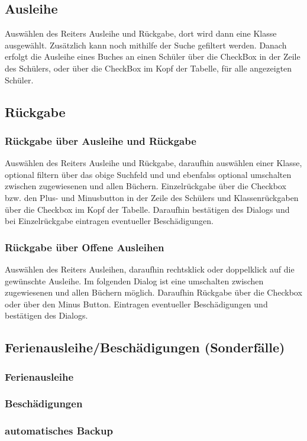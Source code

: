 \subsection{Ausleihe}
Auswählen des Reiters Ausleihe und Rückgabe, dort wird dann eine Klasse ausgewählt. Zusätzlich kann noch mithilfe der Suche  gefiltert werden. Danach erfolgt die Ausleihe eines Buches an einen Schüler über die CheckBox in der Zeile des Schülers, oder über die CheckBox im Kopf der Tabelle, für alle angezeigten Schüler.

\subsection{Rückgabe}
\subsubsection{Rückgabe über Ausleihe und Rückgabe}
Auswählen des Reiters Ausleihe und Rückgabe, daraufhin auswählen einer Klasse, optional filtern über das obige Suchfeld und und ebenfalss optional umschalten zwischen zugewiesenen und allen Büchern. Einzelrückgabe über die Checkbox bzw. den Plus- und Minusbutton in der Zeile des Schülers und Klassenrückgaben über die Checkbox im Kopf der Tabelle. Daraufhin bestätigen des Dialogs und bei Einzelrückgabe eintragen eventueller Beschädigungen.

\subsubsection{Rückgabe über Offene Ausleihen}
Auswählen des Reiters Ausleihen, daraufhin rechtsklick oder doppelklick auf die gewünschte Ausleihe. Im folgenden Dialog ist eine umschalten zwischen zugewiesenen und allen Büchern möglich. Daraufhin Rückgabe über die Checkbox oder über den Minus Button. Eintragen eventueller Beschädigungen und bestätigen des Dialogs.

\subsection{Ferienausleihe/Beschädigungen (Sonderfälle)}

\subsubsection{Ferienausleihe}

\subsubsection{Beschädigungen}

\subsubsection{automatisches Backup}
